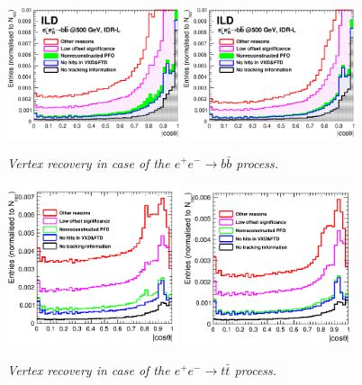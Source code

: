 \documentclass[preprint]{elsarticle}
\begin{document}
\begin{figure}
\centering
\includegraphics[width=0.45\textwidth]{figures_Methods/beforeVR_bbbar_l5.eps}
\includegraphics[width=0.45\textwidth]{figures_Methods/afterVR_bbbar_l5.eps}
\caption{\label{fig:vtx-recov-bbbar} \sl Vertex recovery in case of the  $e^+e^-\rightarrow b\bar{b}$ process.}
\end{figure}

\begin{figure}
\centering
\includegraphics[width=0.45\textwidth]{figures_Methods/beforeVR_ttbar.png}
\includegraphics[width=0.45\textwidth]{figures_Methods/afterVR_ttbar.png}
\caption{\label{fig:vtx-recov-ttbar} \sl Vertex recovery in case of the  $e^+e^-\rightarrow t\bar{t}$ process.}
\end{figure}
\end{document}
